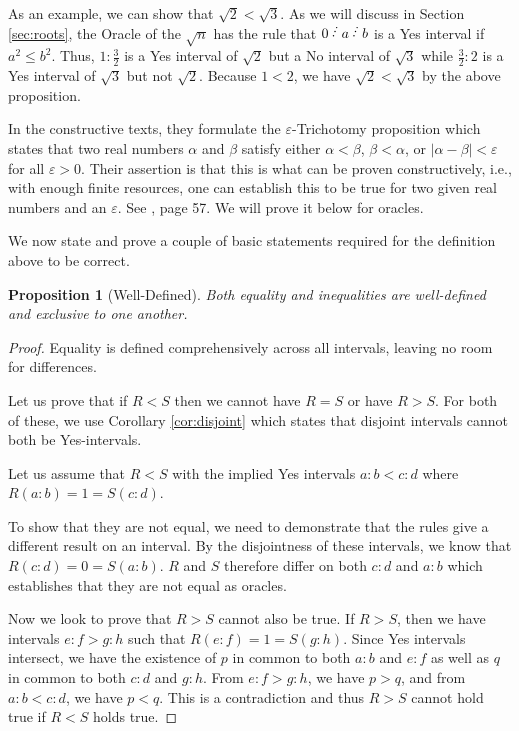 \documentclass[12pt]{article}
\newtheorem{proposition}{Proposition}[subsection]
\begin{document}
As an example, we can show that $\sqrt{2} < \sqrt{3}$. As we will discuss in Section \ref{sec:roots}, the Oracle of the $\sqrt{n}$ has the rule that $0 \lte a\lte b$ is a Yes interval if $a^2 \leq b^2$. Thus, $1:\frac{3}{2}$ is a Yes interval of $\sqrt{2}$ but a No interval of $\sqrt{3}$ while $\frac{3}{2}:2$ is a Yes interval of $\sqrt{3}$ but not $\sqrt{2}$. Because $1 < 2$, we have $\sqrt{2} < \sqrt{3}$ by the above proposition. 

In the constructive texts, they formulate the $\varepsilon$-Trichotomy proposition which states that two real numbers $\alpha$ and $\beta$ satisfy either $\alpha < \beta$, $\beta < \alpha$, or $|\alpha - \beta| < \varepsilon$ for all $\varepsilon > 0$. Their assertion is that this is what can be proven constructively, i.e., with enough finite resources, one can establish this to be true for two given real numbers and an $\varepsilon$. See \cite{bridger}, page 57. We will prove it below for oracles.  

We now state and prove a couple of basic statements required for the definition above to be correct. 

\begin{proposition}[Well-Defined]\label{pr:wd}
Both equality and inequalities are well-defined and exclusive to one another.  
\end{proposition}

\begin{proof}
Equality is defined comprehensively across all intervals, leaving no room for differences. 

Let us prove that if $R < S$ then we cannot have $R=S$ or have $R > S$. For both of these, we use Corollary \ref{cor:disjoint} which states that disjoint intervals cannot both be Yes-intervals. 

Let us assume that $R<S$ with the implied Yes intervals $a:b < c:d$ where $R(a:b)=1 =S(c:d)$.

To show that they are not equal, we need to demonstrate that the rules give a different result on an interval. By the disjointness of these intervals, we know that $R(c:d) = 0 = S(a:b)$. $R$ and $S$ therefore differ on both $c:d$ and $a:b$ which establishes that they are not equal as oracles.  

Now we look to prove that $R>S$ cannot also be true. If $R > S$, then we have intervals $e:f > g:h$ such that $R(e:f) = 1 = S(g:h)$. Since Yes intervals intersect, we have the existence of $p$ in common to both $a:b$ and $e:f$ as well as $q$ in common to both $c:d$ and $g:h$. From $e:f > g:h$, we have $p > q$, and from $a:b < c:d$, we have $p < q$. This is a contradiction and thus $R>S$ cannot hold true if $R<S$ holds true.
\end{proof}
\end{document}
